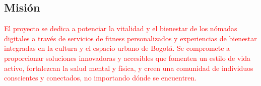 \subsection{Misión}

\textcolor{red}{El proyecto se dedica a potenciar la vitalidad y el bienestar de los nómadas digitales a través de servicios de fitness personalizados y experiencias de bienestar integradas en la cultura y el espacio urbano de Bogotá. Se compromete a proporcionar soluciones innovadoras y accesibles que fomenten un estilo de vida activo, fortalezcan la salud mental y física, y creen una comunidad de individuos conscientes y conectados, no importando dónde se encuentren.}